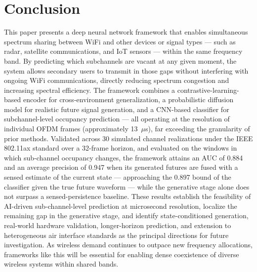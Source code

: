 \documentclass[lettersize,journal]{IEEEtran}
\begin{document}
\section{Conclusion}
This paper presents a deep neural network framework that enables simultaneous spectrum sharing between WiFi and other devices or signal types — such as radar, satellite communications, and IoT sensors — within the same frequency band. By predicting which subchannels are vacant at any given moment, the system allows secondary users to transmit in those gaps without interfering with ongoing WiFi communications, directly reducing spectrum congestion and increasing spectral efficiency. The framework combines a contrastive-learning-based encoder for cross-environment generalization, a probabilistic diffusion model for realistic future signal generation, and a CNN-based classifier for subchannel-level occupancy prediction — all operating at the resolution of individual OFDM frames (approximately 13~$\mu$s), far exceeding the granularity of prior methods. Validated across 30 simulated channel realizations under the IEEE 802.11ax standard over a 32-frame horizon, and evaluated on the windows in which sub-channel occupancy changes, the framework attains an AUC of 0.884 and an average precision of 0.947 when its generated futures are fused with a sensed estimate of the current state — approaching the 0.897 bound of the classifier given the true future waveform — while the generative stage alone does not surpass a sensed-persistence baseline. These results establish the feasibility of AI-driven sub-channel-level prediction at microsecond resolution, localize the remaining gap in the generative stage, and identify state-conditioned generation, real-world hardware validation, longer-horizon prediction, and extension to heterogeneous air interface standards as the principal directions for future investigation. As wireless demand continues to outpace new frequency allocations, frameworks like this will be essential for enabling dense coexistence of diverse wireless systems within shared bands.



\end{document}
